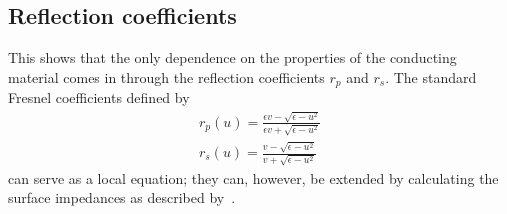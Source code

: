 \documentclass[11pt]{article}
\begin{document}
	\subsection{Reflection coefficients} \label{subsec:ReflectionCoeffs}
	This shows that the only dependence on the properties of the conducting material comes in through the reflection coefficients $r_p$ and $r_s$.
	The standard Fresnel coefficients defined by
	\begin{align}
		r_p(u) = \frac{\epsilon v - \sqrt{\epsilon - u^2}}{\epsilon v + \sqrt{\epsilon - u^2}} \\
		r_s(u) = \frac{v - \sqrt{\epsilon - u^2}}{v + \sqrt{\epsilon - u^2}}
	\end{align}
	can serve as a local equation;
	they can, however, be extended by calculating the surface impedances as described by~\cite{Ford1984}.

	\newpage
	\listoftodos
	\newpage
	\printbibliography
\end{document}

